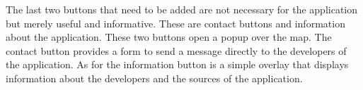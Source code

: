 
The last two buttons that need to be added are not necessary for the application but merely useful and informative. These are contact buttons and information about the application. These two buttons open a popup over the map. The contact button provides a form to send a message directly to the developers of the application. As for the information button is a simple overlay that displays information about the developers and the sources of the application.

